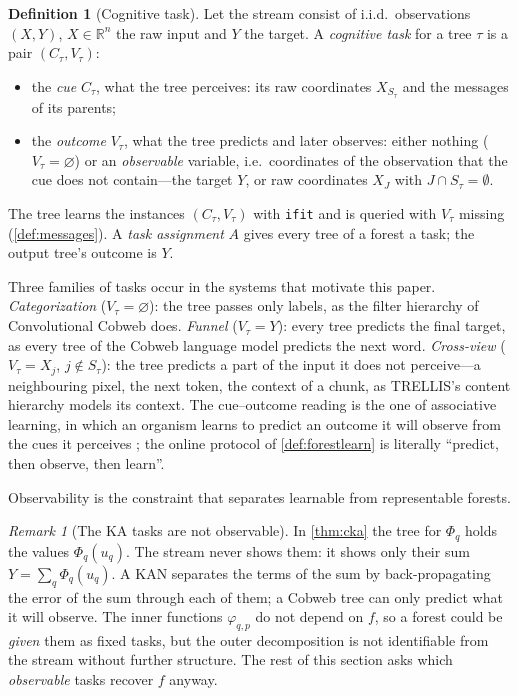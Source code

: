 \documentclass[11pt]{article}
\theoremstyle{definition}
\newtheorem{definition}[theorem]{Definition}
\theoremstyle{remark}
\newtheorem{remark}[theorem]{Remark}
\newcommand{\R}{\mathbb{R}}
\begin{document}
\begin{definition}[Cognitive task]\label{def:task}
Let the stream consist of i.i.d.\ observations $(X,Y)$, $X\in\R^n$ the raw input and
$Y$ the target.  A \emph{cognitive task} for a tree $\tau$ is a pair $(C_\tau,V_\tau)$:
\begin{itemize}[leftmargin=*]
\item the \emph{cue} $C_\tau$, what the tree perceives: its raw coordinates
  $X_{S_\tau}$ and the messages of its parents;
\item the \emph{outcome} $V_\tau$, what the tree predicts and later observes: either
  nothing ($V_\tau=\varnothing$) or an \emph{observable} variable, i.e.\ coordinates of
  the observation that the cue does not contain---the target $Y$, or raw coordinates
  $X_J$ with $J\cap S_\tau=\emptyset$.
\end{itemize}
The tree learns the instances $(C_\tau,V_\tau)$ with \texttt{ifit} and is queried with
$V_\tau$ missing (\cref{def:messages}).  A \emph{task assignment} $A$ gives every tree
of a forest a task; the output tree's outcome is $Y$.
\end{definition}

Three families of tasks occur in the systems that motivate this paper.
\emph{Categorization} ($V_\tau=\varnothing$): the tree passes only labels, as the filter
hierarchy of Convolutional Cobweb does.  \emph{Funnel} ($V_\tau=Y$): every tree predicts
the final target, as every tree of the Cobweb language model predicts the next word.
\emph{Cross-view} ($V_\tau=X_j$, $j\notin S_\tau$): the tree predicts a part of the input
it does not perceive---a neighbouring pixel, the next token, the context of a chunk, as
TRELLIS's content hierarchy models its context.  The cue--outcome reading is the one of
associative learning, in which an organism learns to predict an outcome it will observe
from the cues it perceives \citep{rescorla1972}; the online protocol of
\cref{def:forestlearn} is literally ``predict, then observe, then learn''.

Observability is the constraint that separates learnable from representable forests.

\begin{remark}[The KA tasks are not observable]\label{rem:kaobs}
In \cref{thm:cka} the tree for $\Phi_q$ holds the values $\Phi_q(u_q)$.  The stream
never shows them: it shows only their sum $Y=\sum_q\Phi_q(u_q)$.  A KAN separates the
terms of the sum by back-propagating the error of the sum through each of them; a Cobweb
tree can only predict what it will observe.  The inner functions $\varphi_{q,p}$ do not
depend on $f$, so a forest could be \emph{given} them as fixed tasks, but the outer
decomposition is not identifiable from the stream without further structure.  The rest
of this section asks which \emph{observable} tasks recover $f$ anyway.
\end{remark}
\end{document}
